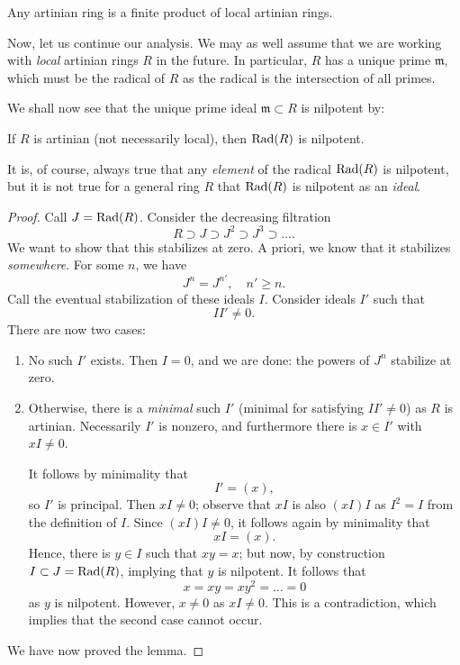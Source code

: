 
\begin{proposition} 
Any artinian ring is a finite product of local artinian rings.
\end{proposition} 

Now, let us continue our analysis. We may as well assume that we are working
with \emph{local} artinian rings $R$ in the future. In particular, $R$ has a unique
prime $\mathfrak{m}$, which must be the radical of $R$ as the radical is the
intersection of all primes. 

We shall now see that the unique prime ideal $\mathfrak{m} \subset R$ is
nilpotent by:
\begin{lemma} \label{radnilpotentartinian}
If $R$ is artinian (not necessarily local), then $\operatorname{Rad} (R) $ is nilpotent.
\end{lemma} 

It is, of course, always true that any \emph{element} of the radical $\operatorname{Rad}(R)$
is nilpotent, but it is not true for a general ring $R$ that $\operatorname{Rad}(R)$ is
nilpotent as an \emph{ideal}.

\begin{proof} 
Call $J = \operatorname{Rad}(R)$. Consider the decreasing filtration
\[ R \supset J \supset J^2 \supset J^3 \supset \dots.  \]
We want to show that this stabilizes at zero. A priori, we know that it
stabilizes \emph{somewhere}. For some $n$, we have
\[ J^n = J^{n'}, \quad n' \geq n.  \]
Call the eventual stabilization of these ideals $I$. Consider ideals $I'$ such
that
\[ II' \neq 0.  \]
There are now two cases:
\begin{enumerate}
\item No such $I'$ exists. Then $I = 0$, and we are done: the powers of
$J^n$ stabilize at zero. 
\item Otherwise,  there is a
\emph{minimal} such $I'$ (minimal for satisfying $II' \neq 0$) as $R$ is
artinian. Necessarily $I'$ is nonzero, and furthermore there is $x \in I'$ with $x I \neq
0$. 

It follows by minimality that
\[ I' = (x) , \]
so $I'$ is principal. Then $xI \neq 0$; observe
that $xI$ is also $(xI)I $ as $I^2  = I$ from the definition of $I$. Since
$(xI) I \neq 0$, it follows again by minimality that
\[ xI = (x).  \] Hence, there is $y \in I$ such that $xy = x$; but now, by construction $I \subset J = \operatorname{Rad} (R)$, implying that $y $ is nilpotent.
It follows that
\[ x = xy = xy^2 = \dots = 0  \]
as $y$ is nilpotent. However, $x \neq 0$ as $xI \neq 0$. This is a
contradiction, which implies that the second case cannot occur. 
\end{enumerate}
We have now proved the lemma.
\end{proof} 

